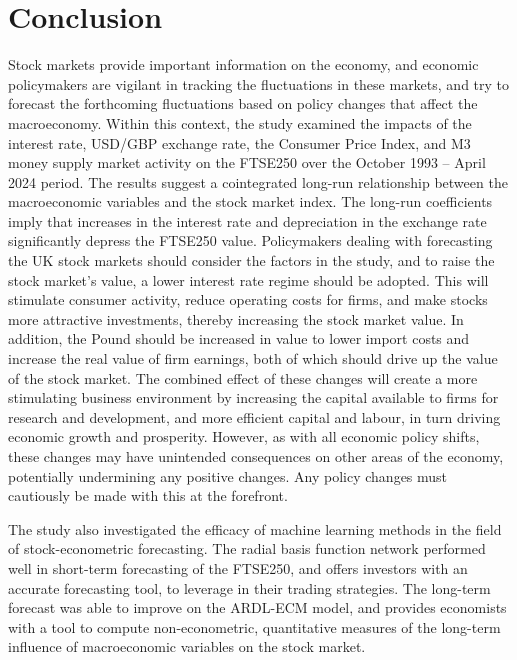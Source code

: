 \documentclass[11pt,a4paper]{article}
\begin{document}
\section{Conclusion}


Stock markets provide important information on the economy, 
and economic policymakers are vigilant in tracking the fluctuations 
in these markets, and try to forecast the 
forthcoming fluctuations based on policy changes that affect the macroeconomy.
Within this context, the study examined the 
impacts of the interest rate, USD/GBP
exchange rate, the Consumer Price Index, and 
M3 money supply market activity on
the FTSE250 over the October 1993 – April 2024 period.
The results suggest a cointegrated long-run
relationship between the macroeconomic variables and the stock market index. 
The long-run coefficients imply that
increases in the interest rate and depreciation in the exchange rate
significantly depress the FTSE250 value. 
Policymakers dealing with forecasting the UK stock markets
should consider the factors in the study, and to raise the stock
market's value, a lower interest rate regime should be adopted. This will 
stimulate consumer activity, reduce operating costs for firms, and make 
stocks more attractive investments, thereby increasing the stock market value. 
In addition, the Pound should be increased in value to lower import costs 
and increase the real value of firm earnings, both of which should drive up 
the value of the stock market. The combined effect of these changes will 
create a more stimulating business environment by increasing the capital 
available to firms for research and development, and more efficient 
capital and labour, in turn 
driving economic growth and prosperity. However, 
as with all economic policy shifts, these changes may have 
unintended consequences on other areas of the economy, potentially 
undermining any positive changes. Any policy changes must cautiously be made 
with this at the forefront.


The study also investigated the efficacy of machine learning methods in 
the field of stock-econometric forecasting. The radial basis function network performed well in
short-term forecasting of the FTSE250, and offers investors with an accurate forecasting tool, 
to leverage in their trading strategies. The long-term forecast was able to improve on the ARDL-ECM model, and provides 
economists with a tool to compute non-econometric, quantitative measures of the 
long-term influence of macroeconomic variables on the stock market. 
\end{document}

